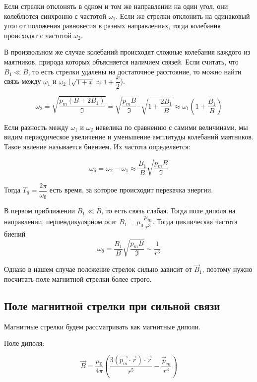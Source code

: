 \documentclass{letask}
\begin{document}
Если стрелки отклонять в одном и том же направлении на один угол, они колеблются синхронно с частотой $\omega_1$. Если же стрелки отклонить на одинаковый угол от положения равновесия в разных направлениях, тогда колебания происходят с частотой $\omega_2$.

В произвольном же случае колебаний происходят сложные колебания каждого из маятников, природа которых объясняется наличием связей.
Если считать, что $B_1 \ll B$, то есть стрелки удалены на достаточное расстояние, то можно найти связь между $\omega_1$ и $\omega_2$ ($\sqrt{1+x} \approx 1 + \dfrac{x}{2}$).

\begin{equation}
\omega_2 = \sqrt{\dfrac{p_m(B+2B_1)}{\mathfrak{I}}} = \sqrt{\dfrac{p_m B}{\mathfrak{I}}} \cdot \sqrt{1+\dfrac{2B_1}{B}} \approx \omega_1(1+\dfrac{B_1}{B})
\end{equation}

Если разность между $\omega_1$ и $\omega_2$ невелика по сравнению с самими величинами, мы видим периодическое увеличение и уменьшение амплитуды колебаний маятников. Такое явление называется биением. Их частота определяется:

\begin{equation}
\omega_{\text{б}} = \omega_2 - \omega_1 \approx \dfrac{B_1}{B} \sqrt{\dfrac{p_m B}{\mathfrak{I}}}
\end{equation}

Тогда $T_\text{б} = \dfrac{2\pi}{\omega_\text{б}}$ есть время, за которое происходит перекачка энергии.

В первом приближении $B_1 \ll B$, то есть связь слабая. Тогда поле диполя на направлении, перпендикулярном оси: $B_1 = \mu_0 \dfrac{p_m}{r^3}$.  Тогда циклическая частота биений $$\omega_\text{б} = \dfrac{B_1}{B} \sqrt{\dfrac{p_m B}{\mathfrak{I}}} \sim \dfrac{1}{r^3}$$

Однако в нашем случае положение стрелок сильно зависит от $\vec B_1$, поэтому нужно посчитать поле магнитной стрелки более строго.

\subsection{Поле магнитной стрелки при сильной связи}

Магнитные стрелки будем рассматривать как магнитные диполи. 

Поле диполя:

$$\vec{B} = \dfrac{\mu_0}{4 \pi} \left(\dfrac{3(\vec{p_m} \cdot\vec{r}) \cdot \vec{r}}{r^5} - \dfrac{\vec p_m}{r^3}\right)$$
\end{document}
